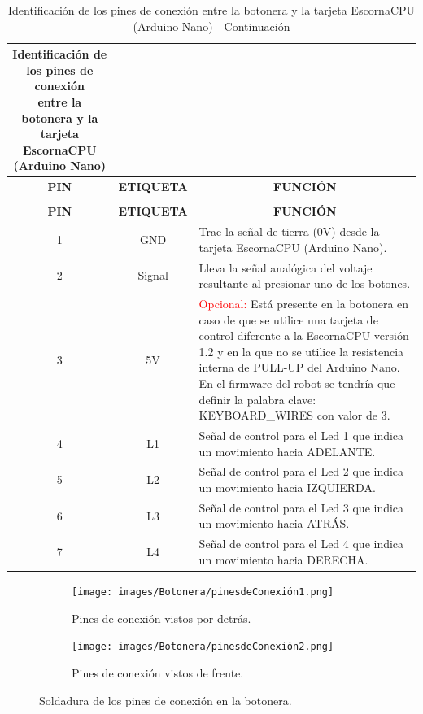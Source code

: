\documentclass{article}
\begin{document}
\begin{longtable}{|c|c|m{}|}
    \caption{Identificación de los pines de conexión \\ entre la botonera y la tarjeta EscornaCPU (Arduino Nano)} \label{tab:pines_de_conexión} \\ \hline 
    \multicolumn{1}{|c|}{\cellcolor[HTML]{C0C0C0}\textbf{PIN}} &
    \multicolumn{1}{|c|}{\cellcolor[HTML]{C0C0C0}\textbf{ETIQUETA}} & \multicolumn{1}{c|}{\cellcolor[HTML]{C0C0C0}\textbf{FUNCIÓN}} \\ \hline 
    \endfirsthead
    \caption{Identificación de los pines de conexión entre la botonera y la tarjeta EscornaCPU (Arduino Nano) - Continuación} \\ \hline
    \multicolumn{1}{|c|}{\cellcolor[HTML]{C0C0C0}\textbf{PIN}} &
    \multicolumn{1}{|c|}{\cellcolor[HTML]{C0C0C0}\textbf{ETIQUETA}} & \multicolumn{1}{c|}{\cellcolor[HTML]{C0C0C0}\textbf{FUNCIÓN}} \\ \hline 
    \endhead
    1 & GND & Trae la señal de tierra (0V) desde la tarjeta EscornaCPU (Arduino Nano). 
    \\ \hline
    2 & Signal & Lleva la señal analógica del voltaje resultante al presionar uno de los botones.
    \\ \hline
    3 & 5V & \textcolor{red}{Opcional:} Está presente en la botonera en caso de que se utilice una tarjeta de control diferente a la EscornaCPU versión 1.2 y en la que no se utilice la resistencia interna de PULL-UP del Arduino Nano. En el firmware del robot se tendría que definir la palabra clave: KEYBOARD\_WIRES con valor de 3.
    \\ \hline
    4 & L1 & Señal de control para el Led 1 que indica un movimiento hacia ADELANTE.
    \\ \hline
    5 & L2 & Señal de control para el Led 2 que indica un movimiento hacia IZQUIERDA. 
    \\ \hline
    6 & L3 & Señal de control para el Led 3 que indica un movimiento hacia ATRÁS. 
    \\ \hline
    7 & L4 & Señal de control para el Led 4 que indica un movimiento hacia DERECHA.
    \\ \hline
\end{longtable}

\begin{figure}[H]
    \centering
    \begin{subfigure}[t]{0.3\textwidth}
        \centering
        \texttt{[image: images/Botonera/pinesdeConexión1.png]}
        \caption{Pines de conexión vistos por detrás.}
        \label{fig:pines_de_conexión1}
    \end{subfigure}%
    \begin{subfigure}[t]{0.3\textwidth}
        \centering
        \texttt{[image: images/Botonera/pinesdeConexión2.png]}
        \caption{Pines de conexión vistos de frente.}
        \label{fig:pines_de_conexión2}
    \end{subfigure}
    \caption{Soldadura de los pines de conexión en la botonera.}
    \label{fig:pines_de_conexión}
\end{figure}
\end{document}
